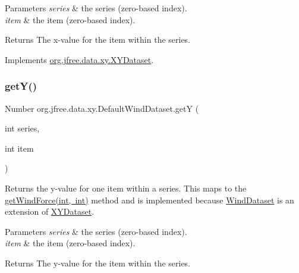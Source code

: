 \begin{DoxyParams}{Parameters}
{\em series} & the series (zero-\/based index). \\
\hline
{\em item} & the item (zero-\/based index).\\
\hline
\end{DoxyParams}
\begin{DoxyReturn}{Returns}
The x-\/value for the item within the series. 
\end{DoxyReturn}


Implements \mbox{\hyperlink{interfaceorg_1_1jfree_1_1data_1_1xy_1_1_x_y_dataset_a85c75ba5b69b551e96afd29d1732ba22}{org.\+jfree.\+data.\+xy.\+X\+Y\+Dataset}}.

\mbox{\label{classorg_1_1jfree_1_1data_1_1xy_1_1_default_wind_dataset_a51ae6185e5c71a07e8e2f496e101e868}} 
\subsubsection{\texorpdfstring{get\+Y()}{getY()}}
{\footnotesize\ttfamily Number org.\+jfree.\+data.\+xy.\+Default\+Wind\+Dataset.\+getY (\begin{DoxyParamCaption}\item[{int}]{series,  }\item[{int}]{item }\end{DoxyParamCaption})}

Returns the y-\/value for one item within a series. This maps to the \mbox{\hyperlink{classorg_1_1jfree_1_1data_1_1xy_1_1_default_wind_dataset_a39588ba40d03b43b02d85b20027eab4f}{get\+Wind\+Force(int, int)}} method and is implemented because {\ttfamily \mbox{\hyperlink{interfaceorg_1_1jfree_1_1data_1_1xy_1_1_wind_dataset}{Wind\+Dataset}}} is an extension of \mbox{\hyperlink{interfaceorg_1_1jfree_1_1data_1_1xy_1_1_x_y_dataset}{X\+Y\+Dataset}}.


\begin{DoxyParams}{Parameters}
{\em series} & the series (zero-\/based index). \\
\hline
{\em item} & the item (zero-\/based index).\\
\hline
\end{DoxyParams}
\begin{DoxyReturn}{Returns}
The y-\/value for the item within the series. 
\end{DoxyReturn}


